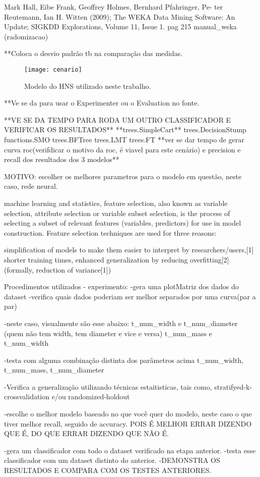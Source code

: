 Mark Hall, Eibe Frank, Geoffrey Holmes, Bernhard Pfahringer, Pe- ter Reutemann, Ian H. Witten (2009); The WEKA Data Mining Software: An Update; SIGKDD Explorations, Volume 11, Issue 1.
pag 215 manual_weka (radomizacao)

**Coloca o desvio padrão tb na comparação das medidas.
\begin{figure}[!htb] \centering 
  \centering
  \texttt{[image: cenario]} 
  \caption{Modelo do HNS utilizado neste trabalho.} 
  \label{fig:hnsworkmodel}
\end{figure}

**Ve se da para usar o Experimenter ou o Evaluation no fonte.


**VE SE DA TEMPO PARA RODA UM OUTRO CLASSIFICADOR E VERIFICAR OS RESULTADOS**
**trees.SimpleCart**
trees.DecisionStump
functions.SMO
trees.BFTree
trees.LMT
trees.FT
**ver se dar tempo de gerar curva roc(verifdicar o motivo da roc, é viavel para este cenário) e precision e recall dos resultados dos 3 modelos**

MOTIVO:
escolher os melhores parametros para o modelo em questão, neste caso, rede neural.

 machine learning and statistics, feature selection, also known as variable selection, attribute selection or variable subset selection, is the process of selecting a subset of relevant features (variables, predictors) for use in model construction. Feature selection techniques are used for three reasons:

        simplification of models to make them easier to interpret by researchers/users,[1]
        shorter training times,
        enhanced generalization by reducing overfitting[2](formally, reduction of variance[1])



Procedimentos utilizados - experimento:
-gera uma plotMatriz dos dados do dataset
-verifica quais dados poderiam ser melhor separados por uma curva(par a par)

-neste caso, visualmente são esse abaixo:
t_num_width e t_num_diameter
(quem não tem width, tem diameter e vice e versa)
t_num_mass e t_num_width

-testa com alguma combinação distinta dos parâmetros acima
t_num_width, t_num_mass, t_num_diameter 

-Verifica a generalização utilizando técnicas estaitisticas, tais como, stratifyed-k-crossvalidation e/ou randomized-holdout

-escolhe o melhor modelo baseado no que você quer do modelo, neste caso o que tiver melhor recall, seguido de accuracy. POIS É MELHOR ERRAR DIZENDO QUE É, DO QUE ERRAR DIZENDO QUE NÃO É.

-gera um classificador com todo o dataset verificado na etapa anterior.
-testa esse classificador com um dataset distinto do anterior.
-DEMONSTRA OS RESULTADOS E COMPARA COM OS TESTES ANTERIORES.